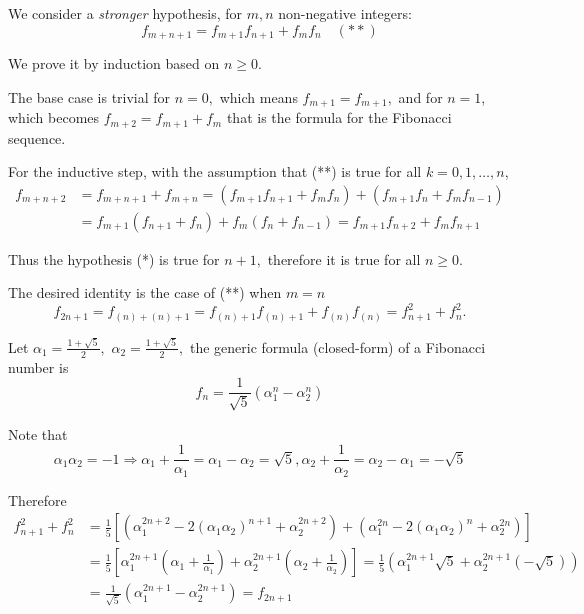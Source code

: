 \documentclass{article}
\begin{document}
\begin{soln}
    We consider a \textit{stronger} hypothesis, for $m, n$ non-negative integers:
    \[
        f_{m+n+1} = f_{m+1}f_{n+1} +f_{m}f_{n} \quad (**)
    \]

    We prove it by induction based on $n \ge 0.$ 

    The base case is trivial for $n=0,$ which means $f_{m+1} = f_{m+1},$
    and for $n=1$, which becomes $f_{m+2} = f_{m+1} + f_{m}$ that is the formula for the Fibonacci sequence.

    For the inductive step, with the assumption that (**) is true for all $k=0,1,\ldots,n$,
    \[
        \begin{aligned}
            f_{m+n+2} &= f_{m+n+1} + f_{m+n} = (f_{m+1}f_{n+1} +f_{m}f_{n}) + (f_{m+1}f_{n} +f_{m}f_{n-1})\\
            &= f_{m+1}(f_{n+1}+f_{n}) + f_{m}(f_{n}+f_{n-1}) = f_{m+1}f_{n+2} + f_{m}f_{n+1}
        \end{aligned}
    \]

    Thus the hypothesis (*) is true for $n+1,$ therefore it is true for all $n \ge 0.$

    The desired identity is the case of (**) when $m=n$
    \[
        f_{2n+1} = f_{(n)+(n)+1} = f_{(n)+1}f_{(n)+1} +f_{(n)}f_{(n)} = f_{n+1}^2 + f_{n}^2.
    \]
\end{soln}

\begin{soln}
    Let $\alpha_1 = \frac{1+\sqrt{5}}{2},$ $\alpha_2 = \frac{1+\sqrt{5}}{2},$ 
    the generic formula (closed-form) of a Fibonacci number is
    \[
        f_n = \frac{1}{\sqrt{5}} (\alpha_1^n - \alpha_2^n)
    \]

    Note that
    \[
        \alpha_1 \alpha_2 = -1 \Rightarrow \alpha_1 + \frac{1}{\alpha_1} = \alpha_1 - \alpha_2 = \sqrt{5}, \alpha_2 + \frac{1}{\alpha_2} =  \alpha_2 - \alpha_1 = -\sqrt{5}
    \]

    Therefore
    \[
        \begin{aligned}
            f_{n+1}^2 + f_{n}^2 &= \frac{1}{5} \left[ (\alpha_1^{2n+2} - 2(\alpha_1 \alpha_2)^{n+1} + \alpha_2^{2n+2}) + (\alpha_1^{2n} - 2(\alpha_1 \alpha_2)^n + \alpha_2^{2n})  \right]\\
            &=\frac{1}{5} \left[ \alpha_1^{2n+1}  \left( \alpha_1 + \frac{1}{\alpha_1} \right) + \alpha_2^{2n+1}  \left( \alpha_2 + \frac{1}{\alpha_2} \right)  \right]
            =\frac{1}{5} \left( \alpha_1^{2n+1} \sqrt{5} + \alpha_2^{2n+1} (-\sqrt{5}) \right)\\
            &= \frac{1}{\sqrt{5}} (\alpha_1^{2n+1} - \alpha_2^{2n+1}) = f_{2n+1}
        \end{aligned}
    \]
\end{soln}
\end{document}
